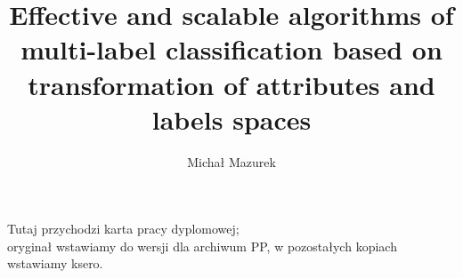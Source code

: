 \documentclass[english,a4paper,oneside]{ppfcmthesis}
\author{Michał Mazurek}
\title{Effective and scalable algorithms of multi-label classification based on transformation of attributes and labels spaces}
\begin{document}
\frontmatter\pagestyle{empty}%
\maketitle\cleardoublepage%

\thispagestyle{empty}\vspace*{\fill}%
\begin{center}Tutaj przychodzi karta pracy dyplomowej;\\oryginał wstawiamy do wersji dla archiwum PP, w pozostałych kopiach wstawiamy ksero.\end{center}%
\vfill\cleardoublepage%

\pagestyle{ppfcmthesis}%





\tableofcontents* \cleardoublepage%

\cleardoublepage
\listoffigures

\cleardoublepage
\listoftables


\mainmatter%






\cleardoublepage\appendix%
%

{\raggedright\sloppy\small}

\ppcolophon
\end{document}
